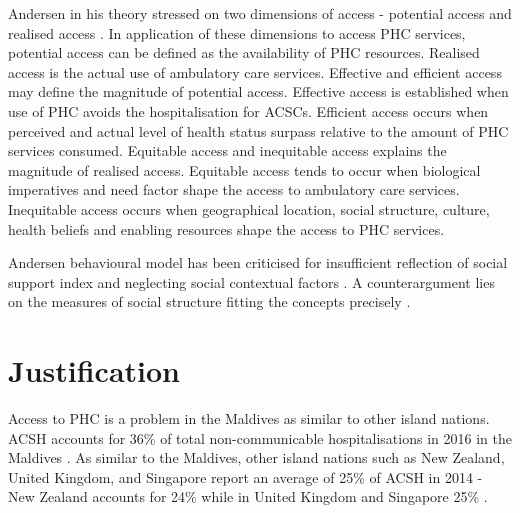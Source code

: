 Andersen in his theory stressed on two dimensions of access - potential access and realised access \cite{andersen2011changing}. In application of these dimensions to access PHC services, potential access can be defined as the availability of PHC resources. Realised access is the actual use of ambulatory care services. Effective and efficient access may define the magnitude of potential access. Effective access is established when use of PHC avoids the hospitalisation for ACSCs. Efficient access occurs when perceived and actual level of health status surpass relative to the amount of PHC services consumed. Equitable access and inequitable access explains the magnitude of realised access. Equitable access tends to occur when biological imperatives and need factor shape the access to ambulatory care services. Inequitable access occurs when geographical location, social structure, culture, health beliefs and enabling resources shape the access to PHC services.

Andersen behavioural model has been criticised for insufficient reflection of social support index \cite{bass1987influence} and neglecting social contextual factors \cite{portes1992mental}. A counterargument lies on the measures of social structure fitting the concepts precisely \cite{andersen1995revisiting}. 

\section{Justification}

Access to PHC is a problem in the Maldives as similar to other island nations. ACSH accounts for 36\% of total non-communicable hospitalisations in 2016 in the Maldives \cite{Maldives:nationalhealthstatistics:2019}. As similar to the Maldives, other island nations such as New Zealand, United Kingdom, and Singapore report an average of 25\% of ACSH in 2014 - New Zealand accounts for 24\%  while in United Kingdom and Singapore 25\% \cite{OECD:Data:countries}. 

